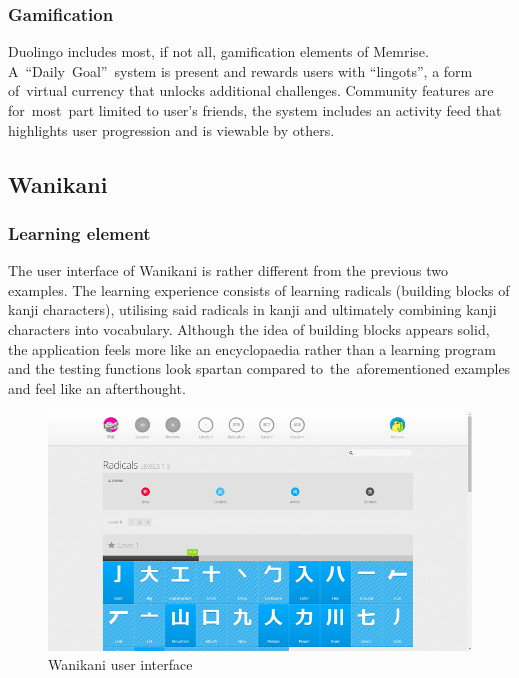 \documentclass[thesis=B,english,hidelinks]{FITthesisXE}[2012/06/26]
\begin{document}
\newpage

\subsubsection{Gamification}

Duolingo includes most, if not all, gamification elements of Memrise. A~``Daily~Goal''~system is present and rewards users with ``lingots'', a form of~virtual currency that unlocks additional challenges. Community features are for~most~part limited to user's friends, the system includes an activity feed that highlights user progression and is viewable by others.

\subsection{Wanikani}

\subsubsection{Learning element}

The user interface of Wanikani is rather different from the previous two examples. The learning experience consists of learning radicals (building blocks of kanji characters), utilising said radicals in kanji and ultimately combining kanji characters into vocabulary. Although the idea of building blocks appears solid, the application feels more like an encyclopaedia rather than a learning program and the testing functions look spartan compared to~the~aforementioned examples and feel like an afterthought.

\begin{figure}[ht]
\centering
\includegraphics[scale=0.45]{wanikani}
\caption{Wanikani user interface}
\label{fig:wanikani}
\end{figure}
\end{document}
